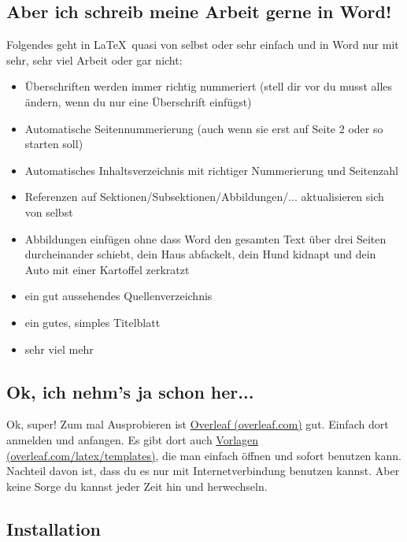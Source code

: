 \documentclass[titlepage]{article}
\begin{document}
\subsection{Aber ich schreib meine Arbeit gerne in Word!}

Folgendes geht in \LaTeX\ quasi von selbst oder sehr einfach und in Word nur mit sehr, sehr viel Arbeit oder gar nicht:
\begin{itemize}
    \item Überschriften werden immer richtig nummeriert (stell dir vor du musst alles ändern, wenn du nur eine Überschrift einfügst)
    \item Automatische Seitennummerierung (auch wenn sie erst auf Seite 2 oder so starten soll)
    \item Automatisches Inhaltsverzeichnis mit richtiger Nummerierung und Seitenzahl
    \item Referenzen auf Sektionen/Subsektionen/Abbildungen/... aktualisieren sich von selbst
    \item Abbildungen einfügen ohne dass Word den gesamten Text über drei Seiten durcheinander schiebt, dein Haus abfackelt, dein Hund kidnapt und dein Auto mit einer Kartoffel zerkratzt
    \item ein gut aussehendes Quellenverzeichnis
    \item ein gutes, simples Titelblatt
    \item sehr viel mehr
\end{itemize}

\subsection{Ok, ich nehm's ja schon her...} \label{hernehmen}

Ok, super! 
Zum mal Ausprobieren ist \href{https://www.overleaf.com/}{Overleaf (overleaf.com)} gut.
Einfach dort anmelden und anfangen.
Es gibt dort auch \href{https://www.overleaf.com/latex/templates}{Vorlagen (overleaf.com/latex/templates)}, die man einfach öffnen und sofort benutzen kann. \\

Nachteil davon ist, dass du es nur mit Internetverbindung benutzen kannst.
Aber keine Sorge du kannst jeder Zeit hin und herwechseln.

\subsection{Installation} \label{Installation}
\end{document}
